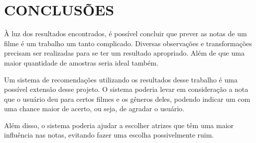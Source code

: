 \section{CONCLUSÕES}
À luz dos resultados encontrados, é possível concluir que prever as notas de um filme é um trabalho um tanto complicado. Diversas observações e transformações precisam ser realizadas para se ter um resultado apropriado. Além de que uma maior quantidade de amostras seria ideal também.

Um sistema de recomendações utilizando os resultados desse trabalho é uma possível extensão desse projeto. O sistema poderia levar em consideração a nota que o usuário deu para certos filmes e os gêneros deles, podendo indicar um com uma chance maior de acerto, ou seja, de agradar o usuário.

Além disso, o sistema poderia ajudar a escolher atrizes que têm uma maior influência nas notas, evitando fazer uma escolha possivelmente ruim.
